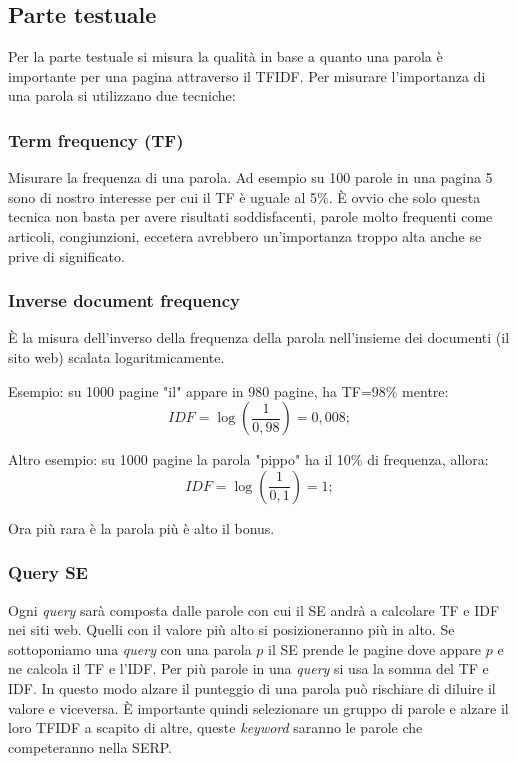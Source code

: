 		\subsection{Parte testuale}
			Per la parte testuale si misura la qualità in base a quanto una parola è importante per una pagina attraverso il TFIDF. Per misurare l'importanza di una parola si utilizzano due tecniche:
			
			\subsubsection{Term frequency (TF)}
				Misurare la frequenza di una parola. Ad esempio su 100 parole in una pagina 5 sono di nostro interesse per cui il TF è uguale al 5\%.
				È ovvio che solo questa tecnica non basta per avere risultati soddisfacenti, parole molto frequenti come articoli, congiunzioni, eccetera avrebbero un'importanza troppo alta anche se prive di significato.
				
			\subsubsection{Inverse document frequency}
				È la misura dell'inverso della frequenza della parola nell'insieme dei documenti (il sito web) scalata logaritmicamente. 
				
				Esempio: su 1000 pagine "il" appare in 980 pagine, ha TF=98\% mentre:
				\[
					IDF=\log \left(\frac{1}{0,98} \right)=0,008;
				\]
				
				Altro esempio: su 1000 pagine la parola "pippo" ha il 10\% di frequenza, allora:
				\[
				IDF=\log \left(\frac{1}{0,1} \right)=1;
				\]
				
				Ora più rara è la parola più è alto il bonus.
				
			\subsubsection{Query SE}
				Ogni \emph{query} sarà composta dalle parole con cui il SE andrà a calcolare TF e IDF nei siti web. Quelli con il valore più alto si posizioneranno più in alto.
				Se sottoponiamo una \emph{query} con una parola $p$  il SE prende le pagine dove appare $p$ e ne calcola il TF e l'IDF. Per più parole in una \emph{query} si usa la somma del TF e IDF.
				In questo modo alzare il punteggio di una parola può rischiare di diluire il valore e viceversa. È importante quindi selezionare un gruppo di parole e alzare il loro TFIDF a scapito di altre, queste \emph{keyword} saranno le parole che competeranno nella SERP.
			
